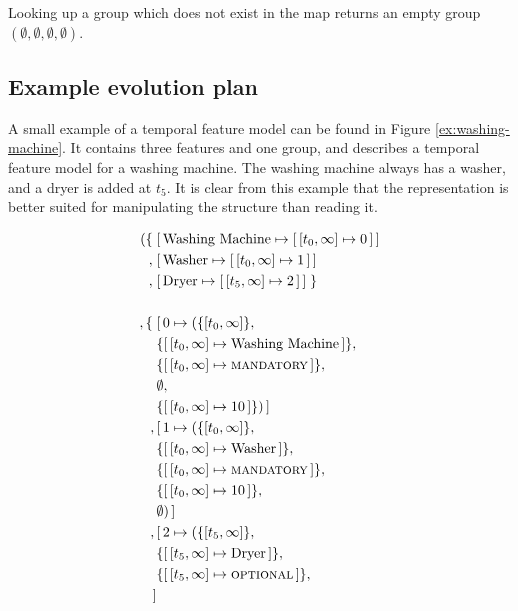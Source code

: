 Looking up a group which does not exist in the map returns an empty group $(\emptyset \comma \emptyset \comma \emptyset \comma \emptyset)$. 

\subsection{Example evolution plan}
A small example of a temporal feature model can be found in Figure \vref{ex:washing-machine}. It contains three features and one group, and describes a temporal feature model for a washing machine. The washing machine always has a washer, and a dryer is added at $t_5$. It is clear from this example that the representation is better suited for manipulating the structure than reading it. 

\begin{figure}
  \begin{align*}
    ( \{ \; & \mapping{\text{Washing Machine}}{\intervalmapping{t_0}{\forever}{0}} \\
       ,\; & \mapping{\text{Washer}}{\intervalmapping{t_0}{\forever}{1}} \\
       ,\; & \mapping{\text{Dryer}}{\intervalmapping{t_5}{\forever}{2}}\; \} \\
       \\
       ,\{\; & \mapping{0}{(\{ \interval{t_0}{\forever}\} ,\, \\
             & \{\intervalmapping{t_0}{\forever}{\text{Washing Machine}}\} ,\, \\
             & \{\intervalmapping{t_0}{\forever}{\mandatory{}}\} ,\, \\
             &  \emptyset ,\, \\ 
             & \{\intervalmapping{t_0}{\forever}{10}\} ) } \\
             ,\, & \mapping{1}{(\{\interval{t_0}{\forever}\} ,\, \\
             & \{\intervalmapping{t_0}{\forever}{\text{Washer}}\} ,\, \\
             & \{\intervalmapping{t_0}{\forever}{\mandatory{}}\} ,\, \\
             &  \{\intervalmapping{t_0}{\forever}{10}\} ,\, \\ 
             & \emptyset)} \\
             ,\, & \mapping{2}{(\{\interval{t_5}{\forever}\} ,\, \\
             & \{\intervalmapping{t_5}{\forever}{\text{Dryer}}\} ,\, \\
             & \{\intervalmapping{t_5}{\forever}{\optional{}}\} ,\, \\
}
\end{align*}
\end{figure}
